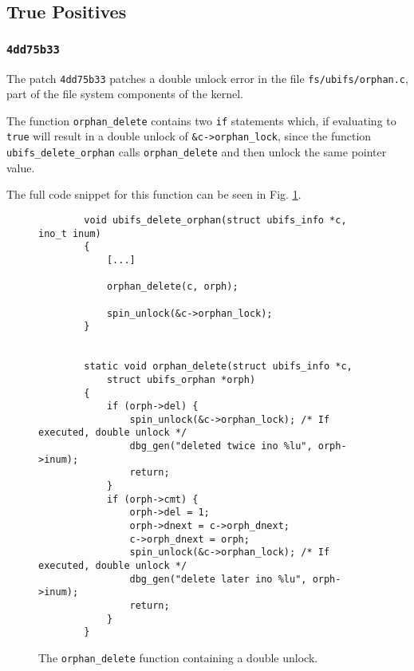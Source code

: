 \subsection{True Positives}

\subsubsection{\texttt{4dd75b33}}

\newpar The patch \texttt{4dd75b33} patches a double unlock error in the file \texttt{fs/ubifs/orphan.c}, part of the file system components of the kernel.

\newpar The function \texttt{orphan\_delete} contains two \texttt{if} statements which, if evaluating to \texttt{true} will result in a double unlock of \texttt{\&c->orphan\_lock}, since the function \texttt{ubifs\_delete\_orphan} calls \texttt{orphan\_delete} and then unlock the same pointer value. 

\newpar The full code snippet for this function can be seen in Fig. \ref{fig:orphan.c}.

\begin{figure}[H]
    \centering
    \begin{verbatim}
        void ubifs_delete_orphan(struct ubifs_info *c, ino_t inum)
        {
            [...]
            
            orphan_delete(c, orph);

            spin_unlock(&c->orphan_lock);
        }


        static void orphan_delete(struct ubifs_info *c, 
            struct ubifs_orphan *orph)
        {
            if (orph->del) {
                spin_unlock(&c->orphan_lock); /* If executed, double unlock */
                dbg_gen("deleted twice ino %lu", orph->inum);
                return;
            }
            if (orph->cmt) {
                orph->del = 1;
                orph->dnext = c->orph_dnext;
                c->orph_dnext = orph;
                spin_unlock(&c->orphan_lock); /* If executed, double unlock */
                dbg_gen("delete later ino %lu", orph->inum);
                return;
            }
        }
    \end{verbatim}
    \caption{The \texttt{orphan\_delete} function containing a double unlock.}
    \label{fig:orphan.c}
\end{figure}